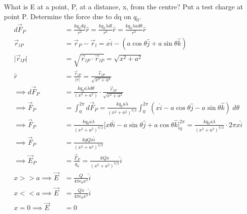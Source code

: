 \documentclass[a4paper, 11pt, normalem]{report}
\begin{document}
What is E at a point, P, at a distance, x, from the centre?
Put a test charge at point P.
Determine the force due to dq on $q_{0}$.
\begin{align}
    d\vec{F}_{P} &= \frac{kq_{0}dq}{r^{2}} \hat{r} = \frac{kq_{0}\lambda dl}{r^{2}} \hat{r} = \frac{kq_{0}\lambda a d\theta}{r^{2}} \hat{r} \\
    \vec{r}_{lP} &= \vec{r}_{P} - \vec{r}_{l} = x \hat{i} - (a\cos\theta \hat{j} + a\sin\theta \hat{k}) \\
    \big|\vec{r}_{lP}\big| &= \sqrt{\vec{r}_{lP} \cdot \vec{r}_{lP}} = \sqrt{x^{2} + a^{2}} \\
    \hat{r} &= \frac{\vec{r}_{lP}}{|r|} = \frac{\vec{r}_{lP}}{\sqrt{x^{2} + a^{2}}} \\
    \implies d\vec{F}_{P} &= \frac{k q_{0} a \lambda d\theta}{(x^{2} + a^{2})} \cdot \frac{\vec{r}_{lP}}{\sqrt{x^{2} + a^{2}}} \\
    \implies \vec{F}_{P} &= \int_{0}^{2\pi} d\vec{F}_{P} = \frac{k q_{0} a \lambda}{(x^{2} + a^{2})^{3/2}} \int_{0}^{2\pi} (x \hat{i} - a\cos\theta \hat{j} - a\sin\theta \hat{k}) \; d\theta \\
    \implies \vec{F}_{P} &= \frac{k q_{0} a \lambda}{(x^{2} + a^{2})^{3/2}} \big[x\theta \hat{i} - a\sin\theta \hat{j} + a\cos\theta \hat{k} \big]_{0}^{2\pi} = \frac{k q_{0} a \lambda}{(x^{2} + a^{2})^{3/2}} \cdot 2\pi x \hat{i} \\
    \implies \vec{F}_{P} &= \frac{k q Q x \hat{i}}{(x^{2} + a^{2})^{3/2}} \\
    \implies \vec{E}_{P} &= \frac{\vec{F}_{P}}{q_{0}} = \frac{k Q x}{(x^{2} + a^{2})^{3/2}} \hat{i} \\
    x >> a \implies \vec{E} &= \frac{Q}{4\pi\epsilon_{0}x^{2}} \hat{i} \\
    x << a \implies \vec{E} &= \frac{Q x}{4\pi\epsilon_{0}x^{2}} \hat{i} \\
    x = 0 \implies \vec{E} &= 0
\end{align}

\chapter{}
\end{document}
